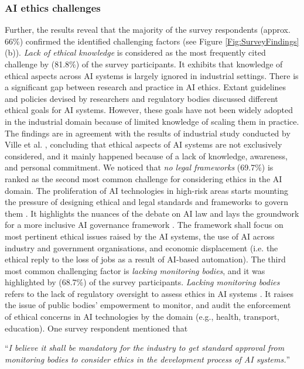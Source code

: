 \subsubsection{AI ethics challenges}

Further, the results reveal that the majority of the survey respondents (approx. 66\%) confirmed the identified challenging factors \cite{AR13} (see Figure \ref{Fig:SurveyFindings}(b)). \textit{Lack of ethical knowledge} is considered as the most frequently cited challenge by (81.8\%) of the survey participants. It exhibits that knowledge of ethical aspects across AI systems is largely ignored in industrial settings. There is a significant gap between research and practice in AI ethics. Extant guidelines and policies devised by researchers and regulatory bodies discussed different ethical goals for AI systems. However, these goals have not been widely adopted in the industrial domain because of limited knowledge of scaling them in practice. The findings are in agreement with the results of industrial study conducted by Ville et al. \cite{AR10}, concluding that ethical aspects of AI systems are not exclusively considered, and it mainly happened because of a lack of knowledge, awareness, and personal commitment. We noticed that \textit{no legal frameworks} (69.7\%) is ranked as the second most common challenge for considering ethics in the AI domain. The proliferation of AI technologies in high-risk areas starts mounting the pressure of designing ethical and legal standards and frameworks to govern them \cite{cath2018governing}. It highlights the nuances of the debate on AI law and lays the groundwork for a more inclusive AI governance framework \cite{schiff2020s}. The framework shall focus on most pertinent ethical issues raised by the AI systems, the use of AI across industry and government organisations, and economic displacement (i.e. the ethical reply to the loss of jobs as a result of AI-based automation). The third most common challenging factor is \textit{lacking monitoring bodies}, and it was highlighted by (68.7\%) of the survey participants. \textit{Lacking monitoring bodies} refers to the lack of regulatory oversight to assess ethics in AI systems \cite{AR13}. It raises the issue of public bodies’ empowerment to monitor, and audit the enforcement of ethical concerns in AI technologies by the domain (e.g., health, transport, education). One survey respondent mentioned that 

\faComment{} “\textit{I believe it shall be mandatory for the industry to get standard approval from monitoring bodies to consider ethics in the development process of AI systems.}” 

